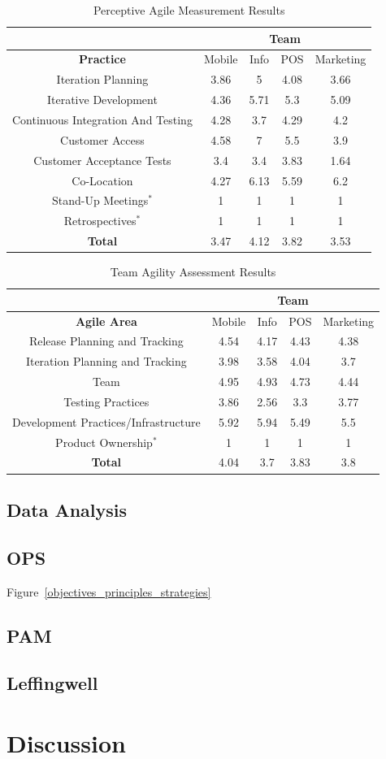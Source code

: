 \begin{table} [H]
\caption{Perceptive Agile Measurement Results}
\label{table:pam_results}
\begin{tabular}{| c | c | c | c | c |}
\hline
  & \multicolumn{4}{c|}{\textbf{Team}} \\ \hline
\textbf{Practice} & Mobile & Info & POS & Marketing \\ \hline
Iteration Planning & 3.86 & 5 & 4.08 & 3.66 \\ \hline
Iterative Development & 4.36 & 5.71 & 5.3 & 5.09 \\ \hline
Continuous Integration And Testing & 4.28 & 3.7 & 4.29 & 4.2 \\ \hline
Customer Access & 4.58 & 7 & 5.5 & 3.9 \\ \hline
Customer Acceptance Tests & 3.4 & 3.4 & 3.83 & 1.64 \\ \hline
Co-Location & 4.27 & 6.13 & 5.59 & 6.2 \\ \hline 
Stand-Up Meetings$^\ast$ & 1 & 1 & 1 & 1 \\ \hline
Retrospectives$^\ast$ & 1 & 1 & 1 & 1 \\ \hline
\textbf{Total} & 3.47 & 4.12 & 3.82 & 3.53 \\ \hline
\end{tabular}
\end{table}

\begin{table} [H]
\caption{Team Agility Assessment Results}
\label{table:taa_results}
\begin{tabular}{| c | c | c | c | c |}
\hline
  & \multicolumn{4}{c|}{\textbf{Team}} \\ \hline
\textbf{Agile Area} & Mobile & Info & POS & Marketing \\ \hline
Release Planning and Tracking & 4.54 & 4.17 & 4.43 & 4.38 \\ \hline
Iteration Planning and Tracking & 3.98 & 3.58 & 4.04 & 3.7 \\ \hline
Team & 4.95 & 4.93 & 4.73 & 4.44 \\ \hline
Testing Practices & 3.86 & 2.56 & 3.3 & 3.77 \\ \hline
Development Practices/Infrastructure & 5.92 & 5.94 & 5.49 & 5.5 \\ \hline
Product Ownership$^\ast$ & 1 & 1 & 1 & 1 \\ \hline 
\textbf{Total} & 4.04 & 3.7 & 3.83 & 3.8 \\ \hline
\end{tabular}
\end{table}

\subsection{Data Analysis}


\subsection{OPS}
Figure~\ref{objectives_principles_strategies}
\subsection{PAM}
\subsection{Leffingwell}
\section{Discussion}
